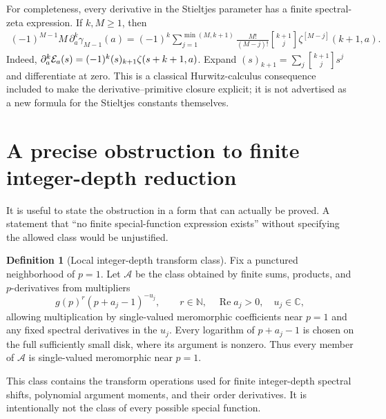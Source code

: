\documentclass[11pt,letterpaper]{article}
\numberwithin{equation}{section}
\theoremstyle{definition}\newtheorem{definition}[theorem]{Definition}
\theoremstyle{remark}\newtheorem{remark}[theorem]{Remark}
\newcommand{\C}{\mathbb C}\newcommand{\R}{\mathbb R}
\newcommand{\N}{\mathbb N}\newcommand{\Q}{\mathbb Q}
\newcommand{\Rea}{\operatorname{Re}}\newcommand{\Ima}{\operatorname{Im}}
\newcommand{\stir}[2]{\genfrac{[}{]}{0pt}{}{#1}{#2}}
\begin{document}
For completeness, every derivative in the Stieltjes parameter has a
finite spectral-zeta expression. If $k,M\ge1$, then
\begin{equation}\label{cdl:eq:stieltjesaderivatives}
 \begin{split}
 (-1)^{M-1}M\,\partial_a^k\gamma_{M-1}(a)
 =(-1)^k\sum_{j=1}^{\min(M,k+1)}
 \frac{M!}{(M-j)!}\stir{k+1}{j}\zeta^{[M-j]}(k+1,a).
 \end{split}
\end{equation}
Indeed, $\partial_a^k\mathcal E_a(s)=(-1)^k(s)_{k+1}\zeta(s+k+1,a)$.
Expand $(s)_{k+1}=\sum_j\stir{k+1}{j}s^j$ and differentiate at zero.
This is a classical Hurwitz-calculus consequence included to make the
derivative--primitive closure explicit; it is not advertised as a new
formula for the Stieltjes constants themselves.

\section{A precise obstruction to finite integer-depth reduction}
\label{cdl:sec:obstruction}

It is useful to state the obstruction in a form that can actually be
proved. A statement that ``no finite special-function expression exists''
without specifying the allowed class would be unjustified.

\begin{definition}[Local integer-depth transform class]
\label{cdl:def:class}
Fix a punctured neighborhood of $p=1$. Let $\mathscr A$ be the class
obtained by finite sums, products, and $p$-derivatives from multipliers
\[
 g(p)^r(p+a_j-1)^{-u_j},\qquad r\in\N,\quad \Rea a_j>0,\quad u_j\in\C,
\]
allowing multiplication by single-valued meromorphic coefficients near
$p=1$ and any fixed spectral derivatives in the $u_j$. Every logarithm
of $p+a_j-1$ is chosen on the full sufficiently small disk, where its
argument is nonzero. Thus every member of $\mathscr A$ is single-valued
meromorphic near $p=1$.
\end{definition}

This class contains the transform operations used for finite integer-depth
spectral shifts, polynomial argument moments, and their order derivatives.
It is intentionally not the class of every possible special function.
\end{document}
